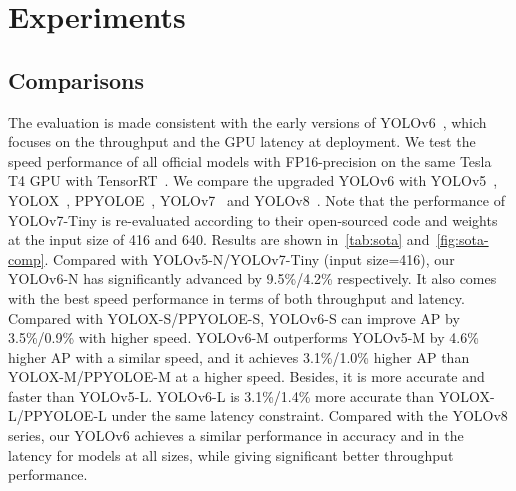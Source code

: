 \documentclass[10pt,twocolumn,letterpaper]{article}
\begin{document}
\begin{table*}[h]
{\begin{tabular}{l|c|c|c|c|c|c|c|c}
        \bottomrule
      \end{tabular}
    }
    \caption{
      Comparisons with other YOLO-series detectors on COCO 2017 \emph{val}. FPS and latency are measured  in FP16-precision on a Tesla T4 in the same environment with TensorRT. All our models are trained for 300 epochs without pre-training or any external data. Both the accuracy and the speed performance of our models are evaluated with the input resolution of 640640. `' represents that the proposed self-distillation method is utilized. `' represents the re-evaluated result of the released model through the official code.
    }
    \label{tab:sota}
  \end{table*}

\section{Experiments}
\label{sec:exp}

\subsection{Comparisons}
  
  The evaluation is made consistent with the early versions of YOLOv6~\cite{li2022yolov6}, which focuses on the throughput  and the GPU latency at deployment. We test the speed performance of all official models with FP16-precision on the same Tesla T4 GPU with TensorRT~\cite{tensorrt}. We compare the upgraded YOLOv6 with YOLOv5~\cite{yolov5}, YOLOX~\cite{ge2021yolox}, PPYOLOE~\cite{xu2022ppyoloe}, YOLOv7~\cite{wang2022yolov7} and YOLOv8~\cite{yolov8}. Note that the performance of YOLOv7-Tiny is re-evaluated according to their open-sourced code and weights at the input size of 416 and 640. Results are shown in~\cref{tab:sota} and~\cref{fig:sota-comp}.
  Compared with YOLOv5-N/YOLOv7-Tiny (input size=416), our YOLOv6-N has significantly advanced by 9.5\%/4.2\% respectively. It also comes with the best speed performance in terms of both throughput and latency. Compared with YOLOX-S/PPYOLOE-S, YOLOv6-S can improve AP by 3.5\%/0.9\% with higher speed. 
  YOLOv6-M outperforms YOLOv5-M by 4.6\% higher AP with a similar speed, and it achieves 3.1\%/1.0\% higher AP than YOLOX-M/PPYOLOE-M at a higher speed. Besides, it is more accurate and faster than YOLOv5-L. YOLOv6-L is 3.1\%/1.4\% more accurate than YOLOX-L/PPYOLOE-L under the same latency constraint. Compared with the YOLOv8 series, our YOLOv6 achieves a similar performance in accuracy and in the latency for models at all sizes, while giving significant better throughput performance.
\end{document}
